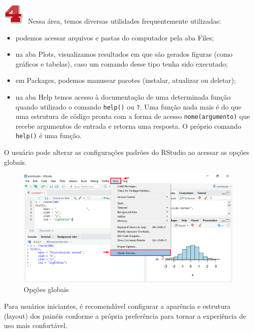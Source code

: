 \documentclass[
  letterpaper,
  DIV=11,
  numbers=noendperiod]{scrreprt}
\begin{document}
\includegraphics{./figuras_tutorialR/number4.png} Nessa área, temos
diversas utilidades frequentemente utilizadas:

\begin{itemize}
\item
  podemos acessar arquivos e pastas do computador pela aba Files;
\item
  na aba Plots, visualizamos resultados em que são gerados figuras (como
  gráficos e tabelas), caso um comando desse tipo tenha sido executado;
\item
  em Packages, podemos manusear pacotes (instalar, atualizar ou
  deletar);
\item
  na aba Help temos acesso à documentação de uma determinada função
  quando utilizado o comando \texttt{help()} ou \texttt{?}. Uma função
  nada mais é do que uma estrutura de código pronta com a forma de
  acesso \texttt{nome(argumento)} que recebe argumentos de entrada e
  retorna uma resposta. O próprio comando \texttt{help()} é uma função.
\end{itemize}

O usuário pode alterar as configurações padrões do RStudio ao acessar as
opções globais.

\begin{figure}

{\centering \includegraphics[width=1\textwidth,height=\textheight]{./figuras_tutorialR/rstudio2.png}

}

\caption{Opções globais}

\end{figure}

Para usuários iniciantes, é recomendável configurar a aparência e
estrutura (layout) dos painéis conforme a própria preferência para
tornar a experiência de uso mais confortável.
\end{document}
